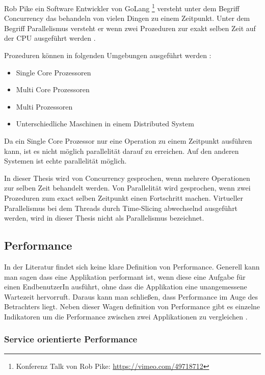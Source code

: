 Rob Pike ein Software Entwickler von GoLang \footnote{Konferenz Talk von Rob Pike: \url{https://vimeo.com/49718712}} versteht unter dem Begriff Concurrency das behandeln von vielen Dingen zu einem Zeitpunkt. Unter dem Begriff Parallelismus versteht er wenn zwei Prozeduren zur exakt selben Zeit auf der CPU ausgeführt werden \cite[]{Pik2013}.

Prozeduren können in folgenden Umgebungen ausgeführt werden \cite[p. 14]{Erb2012}:

\begin{itemize}
  \item Single Core Prozessoren
  \item Multi Core Prozessoren
  \item Multi Prozessoren
  \item Unterschiedliche Maschinen in einem Distributed System
\end{itemize} 

Da ein Single Core Prozessor nur eine Operation zu einem Zeitpunkt ausführen kann, ist es nicht möglich parallelität darauf zu erreichen. Auf den anderen Systemen ist echte parallelität möglich.  

In dieser Thesis wird von Concurrency gesprochen, wenn mehrere Operationen zur selben Zeit behandelt werden.  Von Parallelität wird gesprochen, wenn zwei Prozeduren zum exact selben Zeitpunkt einen Fortschritt machen. Virtueller Parallelismus bei dem Threads durch Time-Slicing abwechselnd ausgeführt werden, wird in dieser Thesis nicht als Parallelismus bezeichnet.

\subsection{Performance}

In der Literatur findet sich keine klare Definition von Performance. Generell kann man sagen dass eine Applikation performant ist, wenn diese eine Aufgabe für einen EndbenutzerIn ausführt, ohne dass die Applikation eine unangemessene Wartezeit hervorruft. Daraus kann man schließen, dass Performance im Auge des Betrachters liegt. Neben dieser Wagen definition von Performance gibt es einzelne Indikatoren um die Performance zwischen zwei Applikationen zu vergleichen \cite[p. 2]{Mol2009}. 

\subsubsection{Service orientierte Performance}

